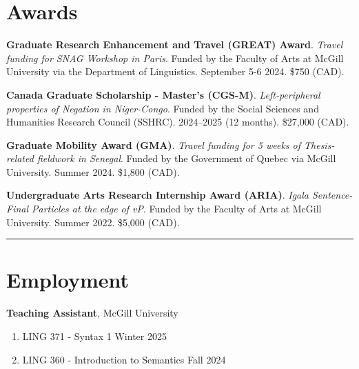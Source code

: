 \documentclass[margin,line]{resume}
\begin{document}
\begin{resume}

		\vspace{-0.5em}

		\section{\mysidestyle Awards}

	
		{\textbf{Graduate Research Enhancement and Travel (GREAT) Award}. \textit{Travel funding for SNAG Workshop in Paris}. Funded by the Faculty of Arts at McGill University via the Department of Linguistics. September 5-6 2024. \$750 (CAD).}
	
		{\textbf{Canada Graduate Scholarship - Master's (CGS-M)}. \textit{Left-peripheral properties of Negation in Niger-Congo}. Funded by the Social Sciences and Humanities Research Council (SSHRC). 2024--2025 (12 months). \$27,000 (CAD).}
		
		{\textbf{Graduate Mobility Award (GMA)}. \textit{Travel funding for 5 weeks of Thesis-related fieldwork in Senegal}. Funded by the Government of Quebec via McGill University. %
		Summer 2024. \$1,800 (CAD).}	
		
		{\textbf{Undergraduate Arts Research Internship Award (ARIA)}. \textit{Igala Sentence-Final Particles at the edge of \textit{v}P}. Funded by the Faculty of Arts at McGill University. %
		Summer 2022. \$5,000 (CAD).}
	
		\vspace{-0.7em}\rule{\textwidth}{0.4pt}


	\vspace{-0.5em}

	\newpage

	\section{\mysidestyle Employment}

	\textbf{Teaching Assistant}, 
	McGill University
	\begin{enumerate}[-, leftmargin=1em, topsep=2pt]
		\item[] LING 371 - Syntax 1 \hfill Winter 2025
		\item[] LING 360 - Introduction to Semantics \hfill Fall 2024
	\end{enumerate}



\end{resume}
\end{document}
